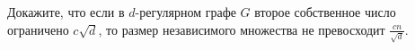 Докажите, что если в $d$-регулярном графе $G$ второе собственное число ограничено $c \sqrt{d}$, то размер
независимого множества не превосходит $\frac{cn}{\sqrt{d}}$.
